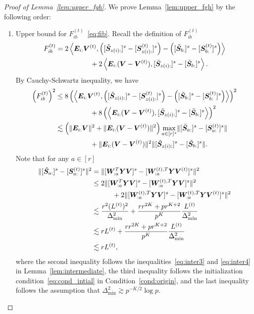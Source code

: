 \documentclass[lettersize,journal]{IEEEtran}
\theoremstyle{definition}
\theoremstyle{definition}
\newcommand{\of}[1]{\left(#1\right)}
\newcommand{\ang}[1]{\left\langle#1\right\rangle}
\begin{document}
\begin{proof}[Proof of Lemma~\ref{lem:upper_fgh}]
We prove Lemma~\ref{lem:upper_fgh} by the following order:
\begin{enumerate}
    \item Upper bound for $F_{ib}^{(t)}$~\eqref{eq:fib}. Recall the definition of $F_{ib}^{(t)}$ 
    \begin{align}
         F_{ib}^{(t)} &= 2 \ang{\mE_{i:} \mV^{(t)}, \of{ [ \tilde \mS_{z(i):} ]^s  - [\mS_{z(i):}^{(t)} ]^s  }  - \of{  [  \tilde \mS_{b:} ]^s  - [ \mS_{b:}^{(t)} ]^s  }  } \\
        & \quad \quad \quad \quad \quad + 2 \ang{ \mE_{i:}(\mV - \mV^{(t)} ), [ \tilde \mS_{z(i):} ]^s - [ \tilde \mS_{b:} ]^s  }.
    \end{align}
    By Cauchy-Schwartz inequality, we have 
    \begin{align}
        \of{F_{ib}^{(t)}}^2 & \leq 8 \of{\ang{\mE_{i:} \mV^{(t)}, \of{ [  \tilde \mS_{z(i):} ]^s  -  [  \mS_{z(i):}^{(t)} ]^s  }  - \of{  [  \tilde \mS_{b:} ]^s  -  [  \mS_{b:}^{(t)} ]^s  }  }  }^2 \\
         & \quad \quad \quad \quad \quad + 8\of{ \ang{ \mE_{i:} (\mV - \mV^{(t)} ), [  \tilde \mS_{z(i):} ]^s - [ \tilde  \mS_{b:} ]^s  }}^2 \\
         & \lesssim \of{ \onormSize{}{\mE_{i:} \mV}^2 + \onormSize{}{\mE_{i:} ( \mV - \mV^{(t)} )}^2 } \max_{a \in [r]^s} \onormSize{}{  [  \tilde \mS_{a:} ]^s - [   \mS_{a:}^{(t)} ]^s  } \\
          & \quad \quad \quad \quad \quad +\onormSize{}{\mE_{i:} ( \mV - \mV^{(t)} )}^2  \onormSize{}{  [  \tilde \mS_{z(i):} ]^s - [  \tilde \mS_{b:} ]^s  }.
    \end{align}
    Note that for any $a \in [r]$ 
    \begin{align}
        \lVert  [  \tilde {\bm S}_{a:} ]^s - [   \bm S_{a:}^{(t)} ]^s  \rVert^2 &= \lVert [ \bm{W}_{:a}^T \bm Y \bm{V} ]^s - [ \bm{W}_{:a}^{(t),T} \bm Y \bm{V}^{(t)} ]^s \rVert^2 \\
        &\leq 2 \lVert [ \bm{W}_{:a}^T \bm Y \bm{V} ]^s  - [ \bm{W}_{:a}^{(t),T} \bm Y \bm{V} ]^s  \rVert^2  \\
        & \quad \quad \quad +2 \lVert[ \bm{W}_{:a}^{(t),T} \bm Y \bm{V} ]^s - [ \bm{W}_{:a}^{(t),T} \bm Y \bm{V}^{(t)} ]^s \rVert^2\\
        & \lesssim \frac{ r^2 (L^{(t)})^2}{ \Delta_{\min}^2} + \frac{ r r^{2K} + p r^{K+2}}{p^K} \frac{L^{(t)}}{\Delta_{\min}^2}\\
        & \lesssim r L^{(t)}+  \frac{ r r^{2K} + p r^{K+2}}{p^K} \frac{L^{(t)}}{\Delta_{\min}^2}\\
        & \lesssim r L^{(t)},
    \end{align}
    where the second inequality follows the inequalities~\eqref{eq:inter3} and \eqref{eq:inter4} in Lemma~\ref{lem:intermediate}, the third inequality follows the initialization condition~\eqref{eq:cond_intial} in Condition~\ref{cond:origin}, and the last inequality follows the assumption that $\Delta_{\min}^2 \gtrsim p^{-K/2}\log p$. 
    

\end{enumerate}
\end{proof}
\end{document}
